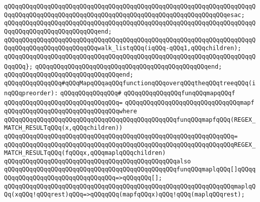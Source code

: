 \verb|qQQqqQQqqQQqqQQqqQQqqQQqqQQqqQQqqQQqqQQqqQQqqQQqqQQqqQQqqQQqqQQqqQQqqQQqqQQqqQQqqQQqqQQqqQQqqQQqqQQqqQQqqQQqqQQqqQQqqQQqqQQqqQQqqQQqesac;|\newline
\newline
\verb|qQQqqQQqqQQqqQQqqQQqqQQqqQQqqQQqqQQqqQQqqQQqqQQqqQQqqQQqqQQqqQQqqQQqqQQqqQQqqQQqqQQqqQQqqQQqqQQqend;|\newline
\newline
\verb|qQQqqQQqqQQqqQQqqQQqqQQqqQQqqQQqqQQqqQQqqQQqqQQqqQQqqQQqqQQqqQQqqQQqqQQqqQQqqQQqqQQqqQQqqQQqqQQqwalk_listqQQq(iqQQq-qQQq1,qQQqchildren);|\newline
\verb|qQQqqQQqqQQqqQQqqQQqqQQqqQQqqQQqqQQqqQQqqQQqqQQqqQQqqQQqqQQqqQQqqQQqqQQqqQQq};|\newline
\verb|qQQqqQQqqQQqqQQqqQQqqQQqqQQqqQQqqQQqqQQqqQQqqQQqend;|\newline
\verb|qQQqqQQqqQQqqQQqqQQqqQQqqQQqqQQqend;|\newline
\newline
\newline
\verb|qQQqqQQqqQQqqQQq#qQQqMapqQQqaqQQqfunctionqQQqoverqQQqtheqQQqtreeqQQq(inqQQqpreorder):|\newline
\verb|qQQqqQQqqQQqqQQq#|\newline
\verb|qQQqqQQqqQQqqQQqfunqQQqmapqQQqf|\newline
\verb|qQQqqQQqqQQqqQQqqQQqqQQqqQQqqQQq=|\newline
\verb|qQQqqQQqqQQqqQQqqQQqqQQqqQQqqQQqmapf|\newline
\verb|qQQqqQQqqQQqqQQqqQQqqQQqqQQqqQQqwhere|\newline
\verb|qQQqqQQqqQQqqQQqqQQqqQQqqQQqqQQqqQQqqQQqqQQqqQQqfunqQQqmapfqQQq(REGEX_MATCH_RESULTqQQq(x,qQQqchildren))|\newline
\verb|qQQqqQQqqQQqqQQqqQQqqQQqqQQqqQQqqQQqqQQqqQQqqQQqqQQqqQQqqQQqqQQq=|\newline
\verb|qQQqqQQqqQQqqQQqqQQqqQQqqQQqqQQqqQQqqQQqqQQqqQQqqQQqqQQqqQQqqQQqREGEX_MATCH_RESULTqQQq(fqQQqx,qQQqmaplqQQqchildren)|\newline
\newline
\verb|qQQqqQQqqQQqqQQqqQQqqQQqqQQqqQQqqQQqqQQqqQQqqQQqalso|\newline
\verb|qQQqqQQqqQQqqQQqqQQqqQQqqQQqqQQqqQQqqQQqqQQqqQQqfunqQQqmaplqQQq[]qQQqqQQqqQQqqQQqqQQqqQQqqQQqqQQqqQQq=>qQQqqQQq[];|\newline
\verb|qQQqqQQqqQQqqQQqqQQqqQQqqQQqqQQqqQQqqQQqqQQqqQQqqQQqqQQqqQQqqQQqmaplqQQq(xqQQq!qQQqrest)qQQq=>qQQqqQQq(mapfqQQqx)qQQq!qQQq(maplqQQqrest);|\newline
